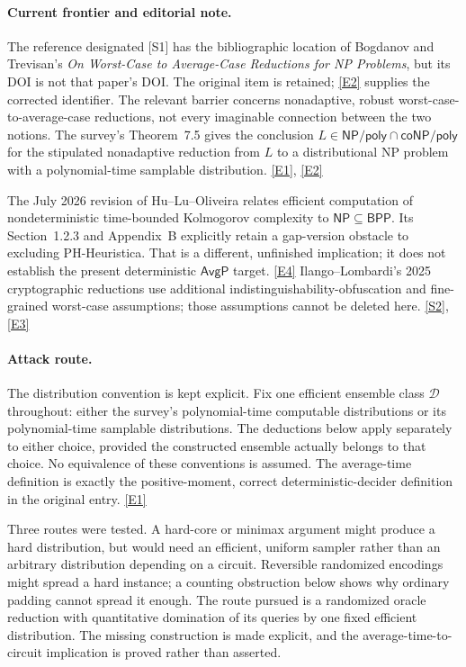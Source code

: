 \documentclass[11pt]{article}
\newcommand{\sref}[2]{\hyperlink{source:#1:#2}{[S#2]}}
\newcommand{\eref}[2]{\hyperlink{extra:#1:#2}{[E#2]}}
\begin{document}
\paragraph{Current frontier and editorial note.}
The reference designated [S1] has the bibliographic location of Bogdanov
and Trevisan's \emph{On Worst-Case to Average-Case Reductions for NP
Problems}, but its DOI is not that paper's DOI. The original item is
retained; \eref{30006698}{2} supplies the corrected identifier. The relevant
barrier concerns nonadaptive, robust worst-case-to-average-case reductions,
not every imaginable connection between the two notions. The survey's
Theorem~7.5 gives the conclusion
$L\in\mathsf{NP/poly}\cap\mathsf{coNP/poly}$ for the stipulated
nonadaptive reduction from $L$ to a distributional NP problem with a
polynomial-time samplable distribution. \eref{30006698}{1}, \eref{30006698}{2}

The July 2026 revision of Hu--Lu--Oliveira relates efficient computation
of nondeterministic time-bounded Kolmogorov complexity to
$\mathsf{NP}\subseteq\mathsf{BPP}$. Its Section~1.2.3 and Appendix~B
explicitly retain a gap-version obstacle to excluding PH-Heuristica.
That is a different, unfinished implication; it does not establish the
present deterministic $\mathsf{AvgP}$ target. \eref{30006698}{4}
Ilango--Lombardi's 2025 cryptographic reductions use additional
indistinguishability-obfuscation and fine-grained worst-case assumptions;
those assumptions cannot be deleted here. \sref{30006698}{2}, \eref{30006698}{3}

\paragraph{Attack route.}
The distribution convention is kept explicit. Fix one efficient ensemble
class $\mathcal D$ throughout: either the survey's polynomial-time
computable distributions or its polynomial-time samplable distributions.
The deductions below apply separately to either choice, provided the
constructed ensemble actually belongs to that choice. No equivalence of
these conventions is assumed. The average-time definition is exactly the
positive-moment, correct deterministic-decider definition in the original
entry. \eref{30006698}{1}

Three routes were tested. A hard-core or minimax argument might produce a
hard distribution, but would need an efficient, uniform sampler rather
than an arbitrary distribution depending on a circuit. Reversible
randomized encodings might spread a hard instance; a counting obstruction
below shows why ordinary padding cannot spread it enough. The route
pursued is a randomized oracle reduction with quantitative domination of
its queries by one fixed efficient distribution. The missing construction
is made explicit, and the average-time-to-circuit implication is proved
rather than asserted.
\end{document}
